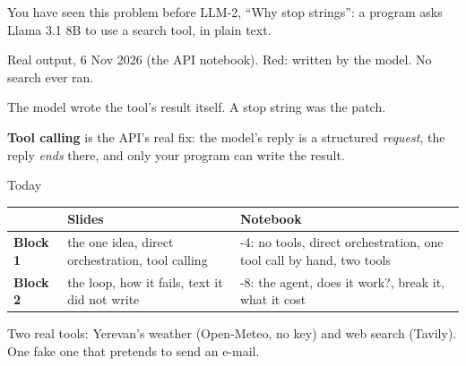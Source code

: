 \documentclass[aspectratio=169]{beamer}
\newcommand{\keybox}[1]{%
  \begin{tcolorbox}[colback=armblue!8, colframe=armblue, boxrule=0.6pt, arc=2pt]
  #1
  \end{tcolorbox}}
\begin{document}
\begin{frame}{You have seen this problem before}
  \vspace{0.2em}
  {\small LLM-2, ``Why stop strings'': a program asks Llama 3.1 8B to use a search tool, in plain text.}

  \vspace{0.3em}

  \vspace{0.2em}
  {\scriptsize\color{gray}Real output, 6 Nov 2026 (the API notebook). Red: written by the model. No
  search ever ran.}

  \vspace{0.5em}
  The model wrote the tool's result itself. A stop string was the patch.

  \vspace{0.4em}
  \keybox{\textbf{Tool calling} is the API's real fix: the model's reply is a structured
  \emph{request}, the reply \emph{ends} there, and only your program can write the result.}
\end{frame}

\begin{frame}{Today}
  \vspace{0.6em}
  \begin{center}
  \small
  \begin{tabular}{l>{\raggedright\arraybackslash}p{}>{\raggedright\arraybackslash}p{}}
    \toprule
    & \textbf{Slides} & \textbf{Notebook} \\
    \midrule
    \textbf{Block 1} & the one idea, direct orchestration, tool calling
      & 1-4: no tools, direct orchestration, one tool call by hand, two tools \\[0.3em]
    \textbf{Block 2} & the loop, how it fails, text it did not write
      & 5-8: the agent, does it work?, break it, what it cost \\
    \bottomrule
  \end{tabular}
  \end{center}

  \vspace{0.8em}
  Two real tools: Yerevan's weather (Open-Meteo, no key) and web search (Tavily). One fake one that
  pretends to send an e-mail.
\end{frame}
\end{document}
